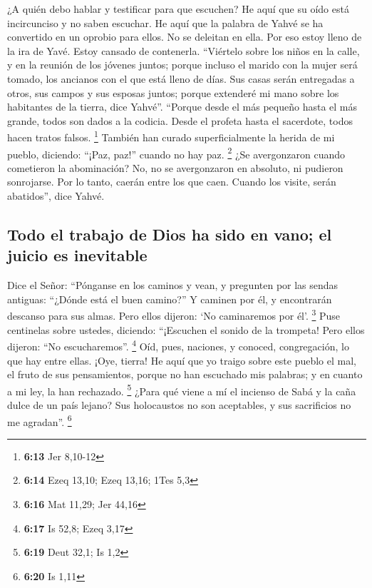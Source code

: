 \begin{paracol}{2}
 ¿A quién debo hablar y testificar para que escuchen? He
aquí que su oído está incircunciso y no saben escuchar. He aquí que la
palabra de Yahvé se ha convertido en un oprobio para ellos. No se
deleitan en ella.  Por eso estoy lleno de la ira de Yavé.
Estoy cansado de contenerla. ``Viértelo sobre los niños en la calle, y
en la reunión de los jóvenes juntos; porque incluso el marido con la
mujer será tomado, los ancianos con el que está lleno de días.
 Sus casas serán entregadas a otros, sus campos y sus
esposas juntos; porque extenderé mi mano sobre los habitantes de la
tierra, dice Yahvé''.  ``Porque desde el más pequeño
hasta el más grande, todos son dados a la codicia. Desde el profeta
hasta el sacerdote, todos hacen tratos falsos. \footnote{\textbf{6:13}
  Jer 8,10-12}  También han curado superficialmente la
herida de mi pueblo, diciendo: ``¡Paz, paz!'' cuando no hay paz.
\footnote{\textbf{6:14} Ezeq 13,10; Ezeq 13,16; 1Tes 5,3}
 ¿Se avergonzaron cuando cometieron la abominación? No,
no se avergonzaron en absoluto, ni pudieron sonrojarse. Por lo tanto,
caerán entre los que caen. Cuando los visite, serán abatidos'', dice
Yahvé.

\hypertarget{todo-el-trabajo-de-dios-ha-sido-en-vano-el-juicio-es-inevitable}{%
\subsection{Todo el trabajo de Dios ha sido en vano; el juicio es
inevitable}\label{todo-el-trabajo-de-dios-ha-sido-en-vano-el-juicio-es-inevitable}}

 Dice el Señor: ``Pónganse en los caminos y vean, y
pregunten por las sendas antiguas: ``¿Dónde está el buen camino?'' Y
caminen por él, y encontrarán descanso para sus almas. Pero ellos
dijeron: `No caminaremos por él'. \footnote{\textbf{6:16} Mat 11,29; Jer
  44,16}  Puse centinelas sobre ustedes, diciendo:
``¡Escuchen el sonido de la trompeta! Pero ellos dijeron: ``No
escucharemos''. \footnote{\textbf{6:17} Is 52,8; Ezeq 3,17}
 Oíd, pues, naciones, y conoced, congregación, lo que hay
entre ellas.  ¡Oye, tierra! He aquí que yo traigo sobre
este pueblo el mal, el fruto de sus pensamientos, porque no han
escuchado mis palabras; y en cuanto a mi ley, la han rechazado.
\footnote{\textbf{6:19} Deut 32,1; Is 1,2}  ¿Para qué
viene a mí el incienso de Sabá y la caña dulce de un país lejano? Sus
holocaustos no son aceptables, y sus sacrificios no me agradan''.
\footnote{\textbf{6:20} Is 1,11}


\end{paracol}
